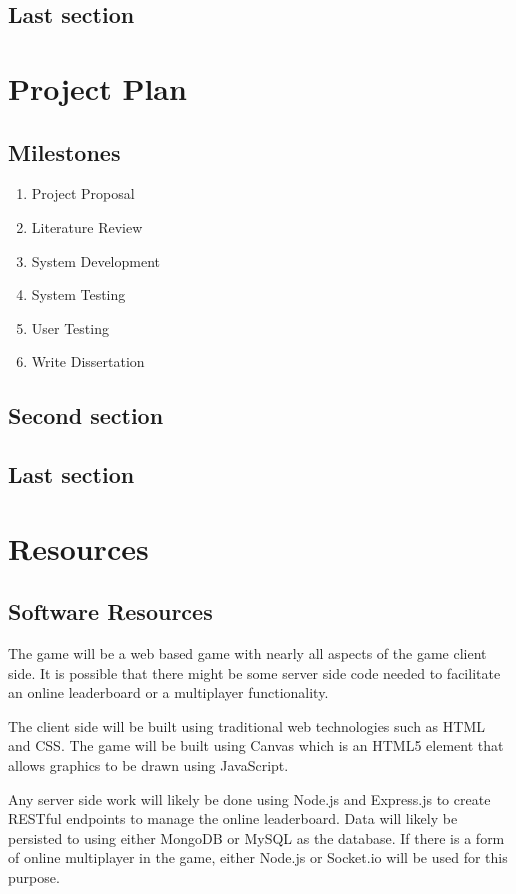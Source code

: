 \documentclass[12pt,a4paper]{report}
\begin{document}
\section{Last section}
\chapter{Project Plan}
\section{Milestones}
\begin{enumerate}
  \item Project Proposal
  \item Literature Review
  \item System Development
  \item System Testing
  \item User Testing
  \item Write Dissertation
\end{enumerate}
\section{Second section}
\section{Last section}

\chapter{Resources}
\section{Software Resources}
The game will be a web based game with nearly all aspects of the game client side. It is possible that there might be some server side code needed to facilitate an online leaderboard or a multiplayer functionality.

The client side will be built using traditional web technologies such as HTML and CSS. The game will be built using Canvas which is an HTML5 element that allows graphics to be drawn using JavaScript. 

Any server side work will likely be done using Node.js and Express.js to create RESTful endpoints to manage the online leaderboard. Data will likely be persisted to using either MongoDB or MySQL as the database. If there is a form of online multiplayer in the game, either Node.js or Socket.io will be used for this purpose.
\end{document}
